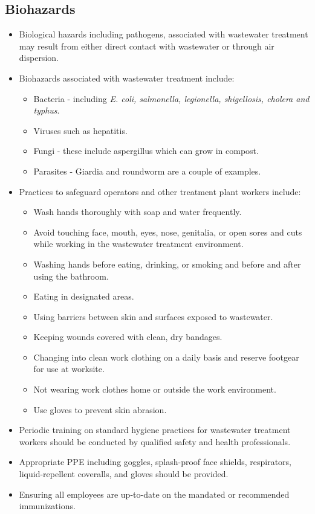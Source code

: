\begin{itemize}
\subsection{Biohazards}
\begin{itemize}
\item Biological hazards including pathogens, associated with wastewater treatment may result from either direct contact with wastewater or through air dispersion.
\item Biohazards associated with wastewater treatment include:
\begin{itemize}
\item Bacteria - including \textit{E. coli, salmonella, legionella, shigellosis, cholera and typhus}.
\item Viruses such as hepatitis.
\item Fungi - these include aspergillus which can grow in compost.
\item Parasites - Giardia and roundworm are a couple of examples.
\end{itemize}
\item Practices to safeguard operators and other treatment plant workers include:
\begin{itemize}
\item Wash hands thoroughly with soap and water frequently.
\item Avoid touching face, mouth, eyes, nose, genitalia, or open sores and cuts while
working in the wastewater treatment environment.
\item Washing hands before eating, drinking, or smoking and before and after using the
bathroom.
\item Eating in designated areas.
\item Using barriers between skin and surfaces exposed to wastewater.
\item Keeping wounds covered with clean, dry bandages.
\item Changing into clean work clothing on a daily basis and reserve footgear for use at
worksite.
\item Not wearing work clothes home or outside the work environment.
\item Use gloves to prevent skin abrasion.
\end{itemize}
\item Periodic training on standard hygiene practices for wastewater treatment workers should be conducted by qualified safety and health professionals.
\item Appropriate PPE  including goggles, splash-proof face shields, respirators, liquid-repellent coveralls, and gloves should be provided.
\item Ensuring all employees are up-to-date on the mandated or recommended immunizations.
\end{itemize}


\end{itemize}
